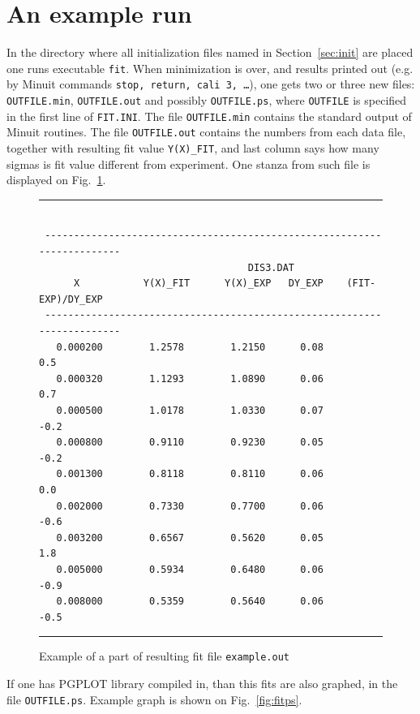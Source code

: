 \documentclass[12pt]{article}
\begin{document}
\section{An example run}

In the directory where all initialization files named in Section~\ref{sec:init} are
placed one runs executable \texttt{fit}. When minimization is over, and results
printed out (e.g. by Minuit commands \texttt{stop, return, cali 3, \dots}), one gets two or 
three new files: \texttt{OUTFILE.min},
\texttt{OUTFILE.out} and possibly \texttt{OUTFILE.ps}, where \texttt{OUTFILE}
is specified in the first line of \texttt{FIT.INI}.
The file \texttt{OUTFILE.min} contains the standard output of Minuit routines.
The file \texttt{OUTFILE.out} contains the numbers from each data file, together with
resulting fit value \texttt{Y(X)\_FIT},
and last column says how many sigmas is fit value different from experiment.
One stanza from such file is displayed on Fig.~\ref{fig:fitout}.

\begin{figure}[ht]
\begin{center}
\hrule
\small
\begin{verbatim}

 ------------------------------------------------------------------------
                                    DIS3.DAT                         
      X           Y(X)_FIT      Y(X)_EXP   DY_EXP    (FIT-EXP)/DY_EXP 
 ------------------------------------------------------------------------ 
   0.000200        1.2578        1.2150      0.08         0.5
   0.000320        1.1293        1.0890      0.06         0.7
   0.000500        1.0178        1.0330      0.07        -0.2
   0.000800        0.9110        0.9230      0.05        -0.2
   0.001300        0.8118        0.8110      0.06         0.0
   0.002000        0.7330        0.7700      0.06        -0.6
   0.003200        0.6567        0.5620      0.05         1.8
   0.005000        0.5934        0.6480      0.06        -0.9
   0.008000        0.5359        0.5640      0.06        -0.5 

\end{verbatim}
\hrule
\end{center}
\caption{Example of a part of resulting fit file \texttt{example.out}}
\label{fig:fitout}
\end{figure}

If one has PGPLOT library compiled in, than this fits are also graphed,
in the file \texttt{OUTFILE.ps}. Example graph is shown on Fig.~\ref{fig:fitps}.
\end{document}
